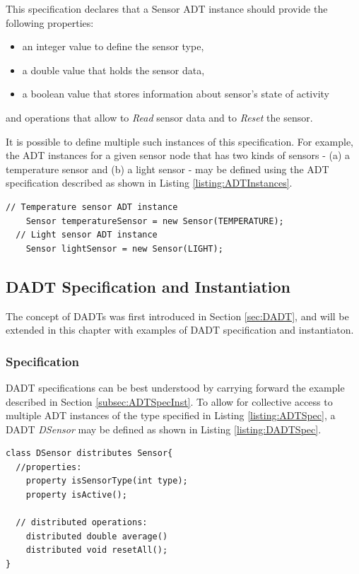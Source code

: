 This specification declares that a Sensor ADT instance should provide the following properties:
\begin{itemize}
\item an integer value to define the sensor type,
\item a double value that holds the sensor data, 
\item a boolean value that stores information about sensor's state of activity
\end{itemize}
and operations that allow to \emph{Read} sensor data and to \emph{Reset}
the sensor.

It is possible to define multiple such instances of this specification. For
example, the ADT instances for a given sensor node that has two kinds of sensors
- (a) a temperature sensor and (b) a light sensor - may be defined using the ADT
specification described as shown in Listing \ref{listing:ADTInstances}. 
\begin{lstlisting}[frame=trbl, basewidth={0.55em, 0.6em}, captionpos=b,
basicstyle=\ttfamily\footnotesize, breaklines, caption = Sensor ADT instances, label =
listing:ADTInstances]
  // Temperature sensor ADT instance
    Sensor temperatureSensor = new Sensor(TEMPERATURE);
  // Light sensor ADT instance  
    Sensor lightSensor = new Sensor(LIGHT);
\end{lstlisting}

\subsection{DADT Specification and Instantiation} \label{subsubsec:dadtspecandinst}

The concept of DADTs was first introduced in Section \ref{sec:DADT}, and will
be extended in this chapter with examples of DADT specification and
instantiaton.

\subsubsection{Specification}
DADT specifications can be best understood by carrying forward the example
described in Section \ref{subsec:ADTSpecInst}. To allow for collective access
to multiple ADT instances of the type specified in Listing
\ref{listing:ADTSpec}, a DADT \emph{DSensor} may be defined as shown in Listing
\ref{listing:DADTSpec}.   
 
\begin{lstlisting}[frame=trbl, basewidth={0.55em, 0.6em}, captionpos=b, 
basicstyle=\ttfamily\footnotesize, breaklines, caption = Data DADT 
specification (reproduced from \cite{migliavacca_DADT:2006}), label = listing:DADTSpec]
class DSensor distributes Sensor{	
  //properties:
    property isSensorType(int type);
    property isActive();

  // distributed operations:
    distributed double average()	
    distributed void resetAll();
}
\end{lstlisting} 
 
